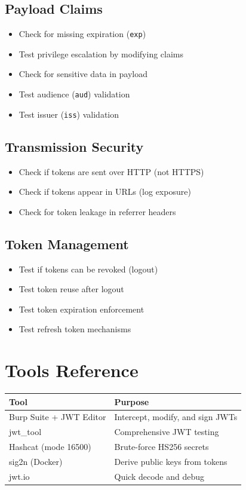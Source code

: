 \documentclass{article}
\begin{document}
\begin{checklistbox}
\subsection*{Payload Claims}
\begin{itemize}
    \item [$\square$] Check for missing expiration (\texttt{exp})
    \item [$\square$] Test privilege escalation by modifying claims
    \item [$\square$] Check for sensitive data in payload
    \item [$\square$] Test audience (\texttt{aud}) validation
    \item [$\square$] Test issuer (\texttt{iss}) validation
\end{itemize}

\subsection*{Transmission Security}
\begin{itemize}
    \item [$\square$] Check if tokens are sent over HTTP (not HTTPS)
    \item [$\square$] Check if tokens appear in URLs (log exposure)
    \item [$\square$] Check for token leakage in referrer headers
\end{itemize}

\subsection*{Token Management}
\begin{itemize}
    \item [$\square$] Test if tokens can be revoked (logout)
    \item [$\square$] Test token reuse after logout
    \item [$\square$] Test token expiration enforcement
    \item [$\square$] Test refresh token mechanisms
\end{itemize}
\end{checklistbox}

\section{Tools Reference}

\begin{tabularx}{\textwidth}{|l|X|}
\hline
\textbf{Tool} & \textbf{Purpose} \\
\hline
Burp Suite + JWT Editor & Intercept, modify, and sign JWTs \\
\hline
jwt\_tool & Comprehensive JWT testing \\
\hline
Hashcat (mode 16500) & Brute-force HS256 secrets \\
\hline
sig2n (Docker) & Derive public keys from tokens \\
\hline
jwt.io & Quick decode and debug \\
\hline
\end{tabularx}
\end{document}
